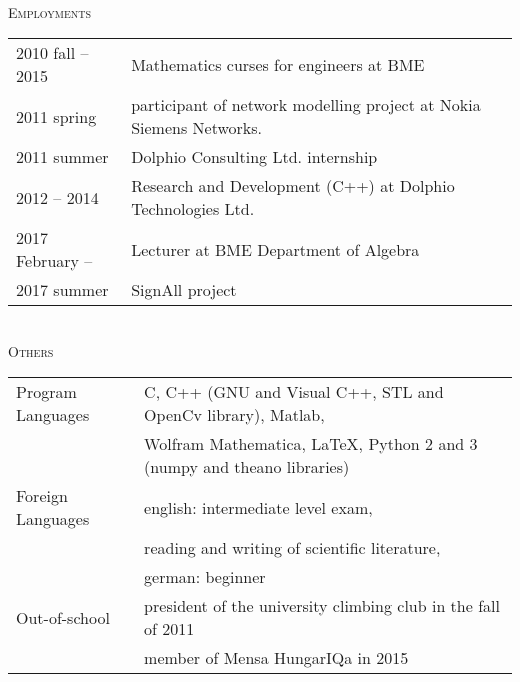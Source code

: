 \documentclass[12pt]{article}
\begin{document}
 \newpage
 { \ } \\
 \textsc{Employments}
 \vspace{0.3cm}
 \\
       \begin{tabular}{p{4cm}l}
	       2010 fall -- 2015 & Mathematics curses for engineers at BME\\
           2011 spring  & participant of network modelling project at Nokia Siemens Networks. \\
		   2011 summer    & Dolphio Consulting Ltd. internship\\
		   2012 -- 2014 & Research and Development (C++) at Dolphio Technologies Ltd. \\
           2017 February -- & Lecturer at BME Department of Algebra \\
           2017 summer & SignAll project
       \end{tabular}
 \vspace{0.3cm}
 \\
 \textsc{Others}
 \vspace{0.3cm}
 \\
        \begin{tabular}{p{3cm}l}
	       Program Languages &  C, C++ (GNU and Visual C++, STL and OpenCv library), Matlab, \\
                             & Wolfram Mathematica, \LaTeX, Python 2 and 3 (numpy and theano libraries)\\
           Foreign Languages & english: intermediate level exam,\\
                &reading and writing of scientific literature, \\
                & german: beginner\\
		   Out-of-school & president of the university climbing club in the fall of 2011\\
                & member of Mensa HungarIQa in 2015
       \end{tabular}
\end{document}
